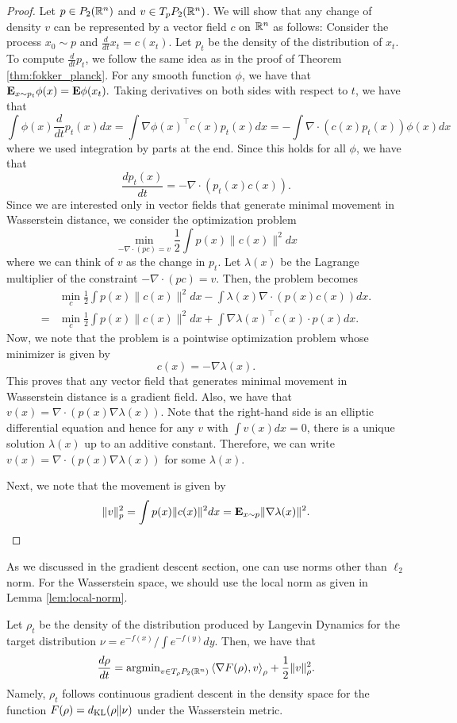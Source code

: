 \begin{proof}
Let $p\in P_{2}(\mathbb{R}^{n})$ and $v\in T_{p}P_{2}(\mathbb{R}^{n})$. We will show that
any change of density $v$ can be represented by a vector field $c$
on $\mathbb{R}^{n}$ as follows: Consider the process $x_{0}\sim p$ and $\frac{d}{dt}x_{t}=c(x_{t})$.
Let $p_{t}$ be the density of the distribution of $x_{t}$. To compute
$\frac{d}{dt}p_{t}$, we follow the same idea as in the proof of Theorem
\ref{thm:fokker_planck}. For any smooth function $\phi$, we have
that $\mathbf{E}_{x\sim p_{t}}\phi(x)=\mathbf{E}\phi(x_{t}).$ Taking derivatives
on both sides with respect to $t$, we have that
\[
\int\phi(x)\frac{d}{dt}p_{t}(x)dx=\int\nabla\phi(x)^{\top}c(x)p_{t}(x)dx=-\int\nabla\cdot(c(x)p_{t}(x))\phi(x)dx
\]
where we used integration by parts at the end. Since this holds for
all $\phi$, we have that
\[
\frac{dp_{t}(x)}{dt}=-\nabla\cdot(p_{t}(x)c(x)).
\]
Since we are interested only in vector fields that generate minimal
movement in Wasserstein distance, we consider the optimization problem
\[
\min_{-\nabla\cdot(pc)=v}\frac{1}{2}\int p(x)\|c(x)\|^{2}dx
\]
where we can think of $v$ as the change in $p_{t}$. Let $\lambda(x)$
be the Lagrange multiplier of the constraint $-\nabla\cdot(pc)=v$.
Then, the problem becomes
\begin{align*}
 & \min_{c}\frac{1}{2}\int p(x)\|c(x)\|^{2}dx-\int\lambda(x)\nabla\cdot(p(x)c(x))dx.\\
= & \min_{c}\frac{1}{2}\int p(x)\|c(x)\|^{2}dx+\int\nabla\lambda(x)^{\top}c(x)\cdot p(x)dx.
\end{align*}
Now, we note that the problem is a pointwise optimization problem
whose minimizer is given by
\[
c(x)=-\nabla\lambda(x).
\]
This proves that any vector field that generates minimal movement
in Wasserstein distance is a gradient field. Also, we have that $v(x)=\nabla\cdot(p(x)\nabla\lambda(x)).$
Note that the right-hand side is an elliptic differential equation
and hence for any $v$ with $\int v(x)dx=0$, there is a unique solution
$\lambda(x)$ up to an additive constant. Therefore, we can write
$v(x)=\nabla\cdot(p(x)\nabla\lambda(x))$ for some $\lambda(x)$.

Next, we note that the movement is given by
\[
\|v\|^{2}_{p}=\int p(x)\|c(x)\|^{2}dx=\mathbf{E}_{x\sim p}\|\nabla\lambda(x)\|^{2}.
\]
\end{proof}
As we discussed in the gradient descent section, one can use norms
other than $\ell_{2}$ norm. For the Wasserstein space, we should
use the local norm as given in Lemma \ref{lem:local-norm}.
\begin{thm}
\label{thm:LD_GD}Let $\rho_{t}$ be the density of the distribution
produced by Langevin Dynamics for the target distribution $\nu=e^{-f(x)}/\int e^{-f(y)}dy$.
Then, we have that
\[
\frac{d\rho}{dt}=\mathrm{argmin}_{v\in T_{\rho}P_{2}(\mathbb{R}^{n})}\left\langle \nabla F(\rho),v\right\rangle _{\rho}+\frac{1}{2}\|v\|^{2}_{\rho}.
\]
Namely, $\rho_{t}$ follows continuous gradient descent in the density
space for the function $F(\rho)=d_{\mathrm{KL}}(\rho\|\nu)$ under the Wasserstein
metric.
\end{thm}

